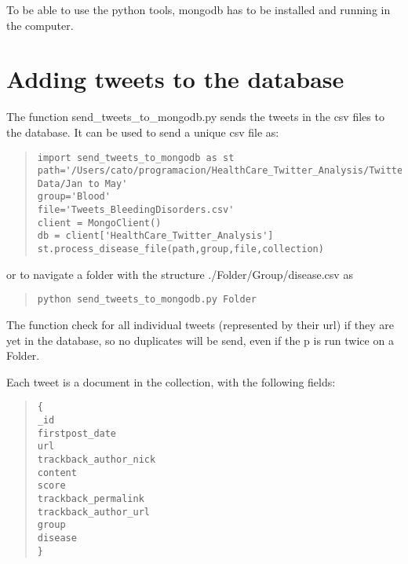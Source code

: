 \documentclass[11pt]{article} %
\begin{document}
To be able to use the python tools, mongodb has to be installed and running in the computer. 

\section{Adding tweets to the database}
The function send\_tweets\_to\_mongodb.py sends the tweets in the csv files to the database. It can be used to send a unique csv file as:

\begin{quote}
\begin{verbatim}
import send_tweets_to_mongodb as st
path='/Users/cato/programacion/HealthCare_Twitter_Analysis/Twitter Data/Jan to May'
group='Blood'
file='Tweets_BleedingDisorders.csv'
client = MongoClient()
db = client['HealthCare_Twitter_Analysis']
st.process_disease_file(path,group,file,collection)
\end{verbatim}
\end{quote}



or to navigate a folder with the structure ./Folder/Group/disease.csv as
\begin{quote}
\begin{verbatim}
python send_tweets_to_mongodb.py Folder
\end{verbatim}
\end{quote}

The function check for all individual tweets (represented by their url) if they are yet in the database, so no duplicates will be send, even if the p is run twice on a Folder.\\

\par
Each tweet is a document in the collection, with the following fields:

\begin{quote}
\begin{verbatim}
{
_id
firstpost_date
url
trackback_author_nick
content
score
trackback_permalink
trackback_author_url
group
disease
}
\end{verbatim}
\end{quote}
\end{document}
